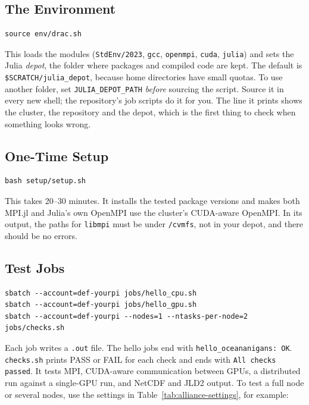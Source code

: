 \subsection{The Environment}

\begin{lstlisting}
source env/drac.sh
\end{lstlisting}

This loads the modules (\texttt{StdEnv/2023}, \texttt{gcc}, \texttt{openmpi}, \texttt{cuda},
\texttt{julia}) and sets the Julia \emph{depot}, the folder where packages and compiled code are
kept. The default is \texttt{\$SCRATCH/julia\_depot}, because home directories have small quotas.
To use another folder, set \texttt{JULIA\_DEPOT\_PATH} \emph{before} sourcing the script. Source it in
every new shell; the repository's job scripts do it for you. The line it prints shows the cluster,
the repository and the depot, which is the first thing to check when something looks wrong.

\subsection{One-Time Setup}

\begin{lstlisting}
bash setup/setup.sh
\end{lstlisting}

This takes 20--30 minutes. It installs the tested package versions and makes both MPI.jl and
Julia's own OpenMPI use the cluster's CUDA-aware OpenMPI. In its output, the paths for
\texttt{libmpi} must be under \texttt{/cvmfs}, not in your depot, and there should be no errors.

\subsection{Test Jobs}

\begin{lstlisting}
sbatch --account=def-yourpi jobs/hello_cpu.sh
sbatch --account=def-yourpi jobs/hello_gpu.sh
sbatch --account=def-yourpi --nodes=1 --ntasks-per-node=2 jobs/checks.sh
\end{lstlisting}

Each job writes a \texttt{.out} file. The hello jobs end with \texttt{hello\_oceananigans: OK}.
\texttt{checks.sh} prints PASS or FAIL for each check and ends with \texttt{All checks passed}.
It tests MPI, CUDA-aware communication between GPUs, a distributed run against a single-GPU run,
and NetCDF and JLD2 output. To test a full node or several nodes, use the settings in
Table~\ref{tab:alliance-settings}, for example:

